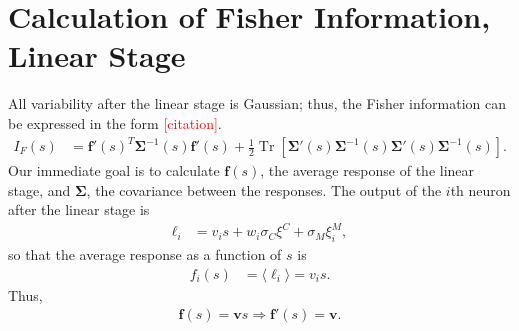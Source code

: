 \documentclass[11pt]{article}
\DeclareMathOperator{\Tr}{Tr}
\begin{document}
	\section{Calculation of  Fisher Information, Linear Stage}
	\label{fisher-linear}
	All variability after the linear stage is Gaussian; thus, the Fisher information can be expressed in the form \textcolor{red}{[citation]}.
	\begin{align}
		I_{F}(s) &= \mathbf{f}'(s)^T \boldsymbol{\Sigma}^{-1} (s) \mathbf{f}'(s) + \frac{1}{2}\Tr\left[\boldsymbol{\Sigma}'(s) \boldsymbol{\Sigma}^{-1}(s)\boldsymbol{\Sigma}'(s) \boldsymbol{\Sigma}^{-1}(s)\right]. \label{IF-gaussian}
	\end{align}
	Our immediate goal is to calculate $\mathbf{f}(s)$, the average response of the linear stage, and $\boldsymbol{\Sigma}$, the covariance between the responses. The output of the $i$th neuron after the linear stage is
	\begin{align}
		\ell_i &= v_i s + w_i \sigma_C \xi^C + \sigma_M\xi_i^M,
	\end{align}
	so that the average response as a function of $s$ is
	\begin{align}
		f_i(s) &= \langle \ell_i \rangle = v_i s.
	\end{align}
	Thus,
	\begin{align}
		\mathbf{f}(s) = \mathbf{v}s \Rightarrow \mathbf{f}'(s) = \mathbf{v}.
	\end{align}
	
\end{document}
